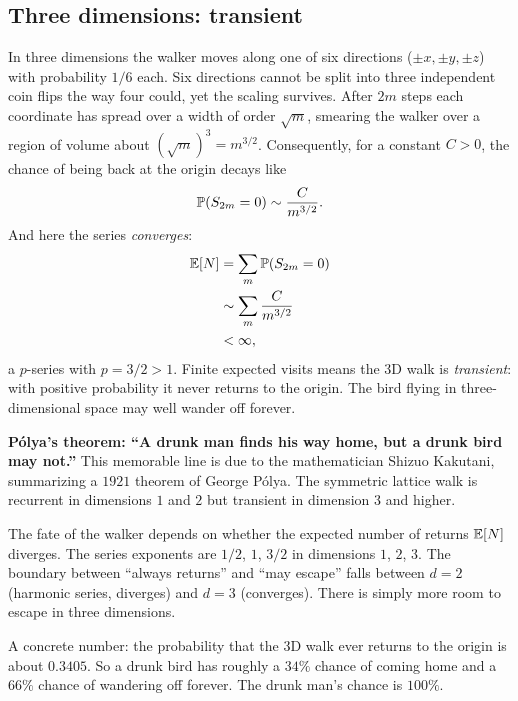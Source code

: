 \subsection{Three dimensions: transient}

In three dimensions the walker moves along one of six directions
($\pm x, \pm y, \pm z$) with probability $1/6$ each. Six directions cannot be split
into three independent coin flips the way four could, yet the scaling survives.
After $2m$ steps each coordinate has spread over a width of order $\sqrt m$,
smearing the walker over a region of volume about $(\sqrt m)^3 = m^{3/2}$.
Consequently, for a constant $C > 0$, the chance of being back at the origin
decays like
\[
  \P(S_{2m} = 0) \sim \frac{C}{m^{3/2}}.
\]
And here the series \emph{converges}:
\begin{align*}
  \E[N] &= \sum_m \P(S_{2m}=0) \\
  &\sim \sum_m \frac{C}{m^{3/2}} \\
  &< \infty,
\end{align*}
a $p$-series with $p = 3/2 > 1$. Finite expected visits means the 3D walk is
\emph{transient}: with positive probability it never returns to the origin.
The bird flying in three-dimensional space may well wander off forever.

\begin{paradoxbox}
\textbf{P\'olya's theorem: ``A drunk man finds his way home, but a drunk bird
may not.''} This memorable line is due to the mathematician Shizuo Kakutani,
summarizing a $1921$ theorem of George P\'olya. The symmetric lattice walk is
recurrent in dimensions $1$ and $2$ but transient in dimension $3$ and higher.

The fate of the walker depends on whether the expected number of returns $\E[N]$ diverges. The series exponents are $1/2$, $1$, $3/2$ in dimensions $1$, $2$, $3$. The boundary between ``always returns'' and ``may escape'' falls between $d = 2$ (harmonic series, diverges) and $d = 3$ (converges). There is simply more room to escape in three dimensions.

A concrete number: the probability that the 3D walk ever returns to the origin
is about $0.3405$. So a drunk bird has roughly a $34\%$ chance of coming home
and a $66\%$ chance of wandering off forever. The drunk man's chance is
$100\%$.
\end{paradoxbox}

